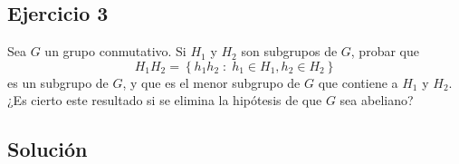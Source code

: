 \documentclass{article}
\begin{document}
\subsection*{Ejercicio 3}

Sea $\displaystyle G $ un grupo conmutativo. Si $\displaystyle H_{1} $ y $\displaystyle H_{2} $ son subgrupos de $\displaystyle G $, probar que 
\[H_{1}H_{2} = \left\{ h_{1}h_{2} \; : \; h_{1} \in H_{1}, h_{2} \in H_{2}\right\}  \]
es un subgrupo de $\displaystyle G $, y que es el menor subgrupo de $\displaystyle G $ que contiene a $\displaystyle H_{1} $ y $\displaystyle H_{2} $. ¿Es cierto este resultado si se elimina la hipótesis de que $\displaystyle G $ sea abeliano?
\subsection*{Solución}
\end{document}
